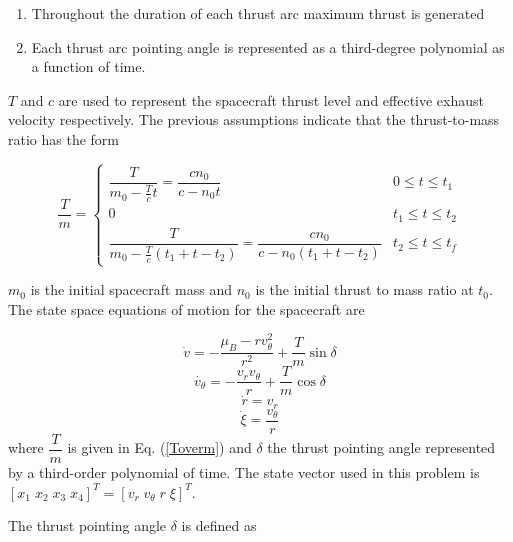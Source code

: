 \begin{enumerate}
    \item Throughout the duration of each thrust arc maximum thrust is generated
    \item Each thrust arc pointing angle is represented as a third-degree polynomial as a function of time.
\end{enumerate}

\noindent $T$ and $c$ are used to represent the spacecraft thrust level and effective exhaust velocity respectively. The previous assumptions
indicate that the thrust-to-mass ratio has the form

\begin{equation}
\dfrac{T}{m} = \begin{cases} 
    \dfrac{T}{m_0-\frac{T}{c}t} = \dfrac{cn_0}{c-n_0t} & 0\leq t \leq t_1 \\
    0 & t_1\leq t \leq t_2 \\
    \dfrac{T}{m_0-\frac{T}{c}(t_1+t-t_2)} = \dfrac{cn_0}{c-n_0(t_1+t-t_2)} & t_2\leq t \leq t_f 
  \end{cases}
  \label{Toverm}
\end{equation}

\noindent $m_0$ is the initial spacecraft mass and $n_0$ is the initial thrust to mass ratio at $t_0$.
The state space equations of motion for the spacecraft are

\begin{equation}
    \dot{v} = -\dfrac{\mu_B-rv_\theta^2}{r^2}+\dfrac{T}{m}\sin\delta
    \label{vrdot_eom}
\end{equation}
\begin{equation}
\dot{v_\theta} = -\dfrac{v_rv_\theta}{r}+\dfrac{T}{m}\cos\delta
\label{vthetadot_eom}
\end{equation}
\begin{equation}
    \dot{r} = v_r
    \label{rdot_eom}
\end{equation}
\begin{equation}
    \label{xidot_eom}
\dot{\xi} = \dfrac{v_\theta}{r}
\end{equation}
where $\dfrac{T}{m}$ is given in Eq. (\ref{Toverm}) and $\delta$ the thrust pointing angle represented by a
third-order polynomial of time. The state vector used in this problem is $[x_1 \; x_2 \; x_3 \; x_4]^T = [ v_r \; v_\theta \; r \; \xi ]^T$. \linebreak

\noindent The thrust pointing angle $\delta$ is defined as 

